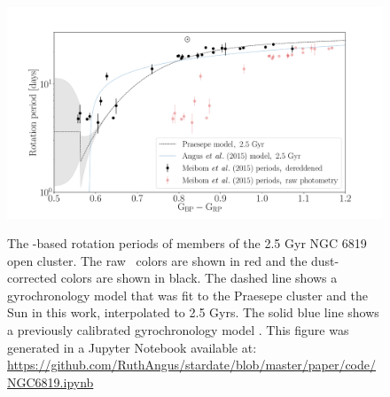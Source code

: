 \begin{figure}
  \caption{
    The \kepler-based rotation periods of members of the 2.5 Gyr NGC 6819 open
    cluster.
    The raw \gcolor\ colors are shown in red and the dust-corrected colors are
    shown in black.
    The dashed line shows a gyrochronology model that was fit to the Praesepe
    cluster and the Sun in this work, interpolated to 2.5 Gyrs.
    The solid blue line shows a previously calibrated gyrochronology model
    \citep{angus2015}.
    This figure was generated in a Jupyter Notebook available at:
    \url{https://github.com/RuthAngus/stardate/blob/master/paper/code/NGC6819.ipynb}
  }
  \centering
    \includegraphics[width=1\textwidth]{NGC6819}
\label{fig:NGC6819}
\end{figure}

